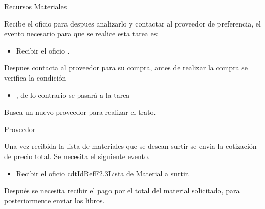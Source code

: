 \begin{PDescripcion}
\begin{enumerate}
    \end{enumerate}
    
    \Ppaso Recursos Materiales

    \begin{enumerate}

      \Ppaso[\itarea]  Recibe el oficio  para despues analizarlo y contactar al proveedor de preferencia, el evento necesario para que se realice esta tarea es:
      \begin{itemize}
      \item Recibir el oficio .
      \end{itemize}
 
 Despues contacta al proveedor para su compra, antes de realizar la compra se verifica la condición
 
 \begin{itemize}
	  \item {}, de lo contrario se pasará a la tarea 
	\end{itemize}
	
\Ppaso[\itarea]  Busca un nuevo proveedor para realizar el trato.
 

    \end{enumerate}
    
    
    
    \Ppaso Proveedor
    
    \begin{enumerate}

      \Ppaso[\itarea]  Una vez recibida la lista de materiales que se desean surtir se envia la cotización de precio total. Se necesita el siguiente evento.
      
      \begin{itemize}
      \item Recibir el oficio cdtIdRef{F2.3}{Lista de Material a surtir}.
      \end{itemize}
 
Después se necesita recibir el pago por el total del material solicitado, para posteriormente enviar los libros.

 

    \end{enumerate}

\end{PDescripcion}
